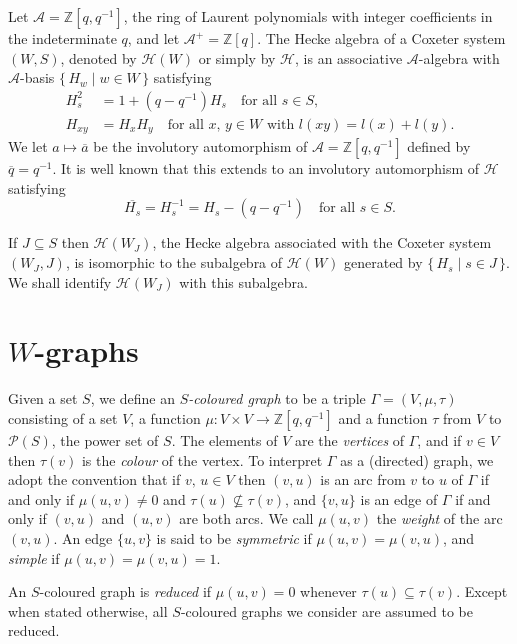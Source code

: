 \documentclass[10pt]{amsart}
\theoremstyle{definition}
\begin{document}
Let $\mathcal{A} = \mathbb{Z}[q, q^{-1}]$, the ring of Laurent
polynomials with integer coefficients in the indeterminate $q$,
and let $\mathcal{A}^{+} = \mathbb{Z}[q]$.
The Hecke algebra of a Coxeter system $(W, S)$, denoted by
$\mathcal{H}(W)$ or simply by $\mathcal{H}$,
is an associative $\mathcal{A}$-algebra with $\mathcal{A}$-basis
$\{\,H_w\mid w\in W\,\}$ satisfying
\begin{align*}
H^{2}_{s} &= 1 + (q -q^{-1})H_{s} \quad \text{for all $s \in S$},\\
H_{xy}&= H_{x}H_{y} \quad
\text{for all $x,\,y \in W$ with $l(xy)=l(x)+l(y)$.}
\end{align*}
We let $a \mapsto \overline{a}$ be the involutory automorphism of
$\mathcal{A}=\mathbb{Z}[q,q^{-1}]$ defined by $\overline{q}=q^{-1}$.
It is well known that this extends to an involutory automorphism of
$\mathcal{H}$ satisfying
\begin{equation*}
\overline{H_{s}} = H_{s}^{-1} = H_{s} - (q - q^{-1}) \quad
\text{for all $s \in S$}.
\end{equation*}

If $J\subseteq S$ then $\mathcal{H}(W_{J})$, the Hecke algebra
associated with the Coxeter system $(W_{J},J)$, is isomorphic to
the subalgebra of $\mathcal{H}(W)$ generated by
$\{\,H_{s} \mid s \in J\,\}$. We shall identify $\mathcal{H}(W_{J})$
with this subalgebra.

\section{\texorpdfstring{$W$}{W}-graphs}
\label{sec:3}

Given a set $S$, we define an \emph{$S$-coloured graph} to be
a triple $\Gamma=(V, \mu, \tau)$ consisting of a set $V\!$, a
function $\mu\colon V \times V\to \mathbb{Z}[q,q^{-1}]$ and a function
$\tau$ from $V$ to $\mathcal{P}(S)$, the power set of $S$.
The elements of $V$ are the \emph{vertices} of $\Gamma$, and if
$v\in V$ then $\tau(v)$ is the \emph{colour} of the vertex.
To interpret $\Gamma$ as a (directed) graph, we adopt the convention that
if $v,\,u\in V$ then $(v,u)$ is an arc from $v$ to $u$ of $\Gamma$
if and only if $\mu(u,v) \neq 0$ and $\tau(u)\nsubseteq\tau(v)$, and
$\{v,u\}$ is an edge of $\Gamma$ if and only if $(v,u)$ and
$(u,v)$ are both arcs. We call $\mu(u,v)$ the \emph{weight}
of the arc~$(v,u)$. An edge $\{u,v\}$ is said to be \emph{symmetric}
if $\mu(u,v)=\mu(v,u)$, and \emph{simple} if $\mu(u,v)=\mu(v,u)=1$.

An $S$-coloured graph is \emph{reduced} if $\mu(u,v)=0$ whenever
$\tau(u)\subseteq\tau(v)$. Except when stated otherwise, all $S$-coloured
graphs we consider are assumed to be reduced.
\end{document}
